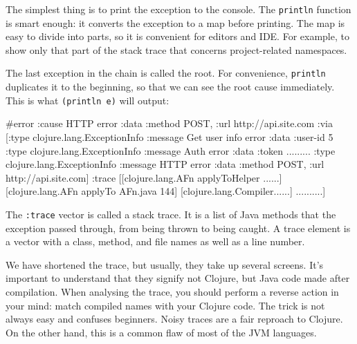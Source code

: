 The simplest thing is to print the exception to the console. The \verb|println| function is smart enough: it converts the exception to a map before printing. The map is easy to divide into parts, so it is convenient for editors and IDE. For example, to show only that part of the stack trace that concerns project-related namespaces.

The last exception in the chain is called the root. For convenience, \verb|println| duplicates it to the beginning, so that we can see the root cause immediately. This is what \verb|(println e)| will output:


\ifnarrow

\begin{clojure}
#error {
 :cause HTTP error
 :data {:method POST,
        :url http://api.site.com}
 :via
 [{:type clojure.lang.ExceptionInfo
   :message Get user info error
   :data {:user-id 5}}
  {:type clojure.lang.ExceptionInfo
   :message Auth error
   :data {:token .........}}
  {:type clojure.lang.ExceptionInfo
   :message HTTP error
   :data {:method POST,
          :url http://api.site.com}}]
 :trace
 [[clojure.lang.AFn applyToHelper ......]
  [clojure.lang.AFn applyTo AFn.java 144]
  [clojure.lang.Compiler......]
  ..........]}
\end{clojure}

\else


\fi


The \verb|:trace| vector is called a stack trace. It is a list of Java methods that the exception passed through, from being thrown to being caught. A trace element is a vector with a class, method, and file names as well as a line number.

We have shortened the trace, but usually, they take up several screens. It's important to understand that they signify not Clojure, but Java code made after compilation. When analysing the trace, you should perform a reverse action in your mind: match compiled names with your Clojure code. The trick is not always easy and confuses beginners. Noisy traces are a fair reproach to Clojure. On the other hand, this is a common flaw of most of the JVM languages.

